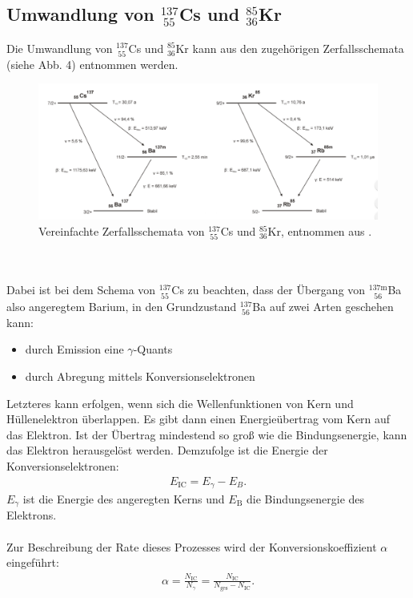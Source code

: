 \documentclass[german,  %
parskip=full,  %
]{scrartcl}
\begin{document}
\subsection{Umwandlung von $^{137}_{\ 55}$Cs und $^{85}_{36}$Kr}
Die Umwandlung von $^{137}_{\ 55}$Cs und $^{85}_{36}$Kr kann aus den zugehörigen Zerfallsschemata (siehe Abb. 4) entnommen werden. \\
\begin{figure}[h!]
\centering
\includegraphics[width=\textwidth]{zerfallsschemata}
\caption{Vereinfachte Zerfallsschemata von $^{137}_{\ 55}$Cs und $^{85}_{36}$Kr, entnommen aus \cite{Anleitung}.}
\end{figure} \\\\
Dabei ist bei dem Schema von $^{137}_{\ 55}$Cs zu beachten, dass der Übergang von $^{137\mathrm{m}}_{\ \ \ 56}$Ba also angeregtem Barium, in den Grundzustand
$^{137}_{\ 56}$Ba auf zwei Arten geschehen kann:
\begin{itemize}
\item durch Emission eine $\gamma$-Quants
\item durch Abregung mittels Konversionselektronen
\end{itemize}
Letzteres kann erfolgen, wenn sich die Wellenfunktionen von Kern und Hüllenelektron überlappen. Es gibt dann einen Energieübertrag vom Kern auf das Elektron. Ist der Übertrag mindestend so groß wie die Bindungsenergie, kann das Elektron herausgelöst werden. Demzufolge ist die Energie der Konversionselektronen:
\begin{align*}
E_{\mathrm{IC}} = E_{\gamma} - E_B.
\end{align*}
$E_{\gamma}$ ist die Energie des angeregten Kerns und $E_\mathrm{B}$ die Bindungsenergie des Elektrons.
\\\\
Zur Beschreibung der Rate dieses Prozesses wird der Konversionskoeffizient $\alpha$ eingeführt:
\begin{align*}
\alpha = \frac{N_{\mathrm{IC}}}{N_{\gamma}} = \frac{N_{\mathrm{IC}}}{N_{\text{ges}} - N_{\mathrm{IC}}}.
\end{align*}
\end{document}
